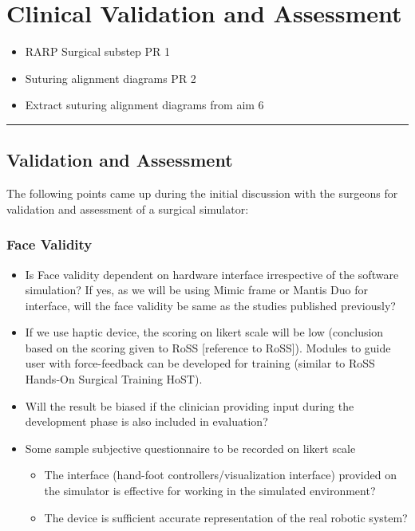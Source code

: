 
\section{Clinical Validation and Assessment}\label{sec:clinical_validation}

\begin{itemize}
  \item RARP Surgical substep PR 1 
  \item Suturing alignment diagrams PR 2 
  \item Extract suturing alignment diagrams from aim 6 
\end{itemize}

\hrule%

\subsection{Validation and Assessment}\label{ssec:validation_assessment}

The following points came up during the initial discussion with the surgeons for validation and assessment of a surgical simulator:

\subsubsection{Face Validity}\label{sssec:face_validity}
\begin{itemize}
  \item Is Face validity dependent on hardware interface irrespective of the software simulation? If yes, as we will be using Mimic frame or Mantis Duo for interface, will the face validity be same as the studies published previously?
  \item If we use haptic device, the scoring on likert scale will be low (conclusion based on the scoring given to RoSS [reference to RoSS]). Modules to guide user with force-feedback can be developed for training (similar to RoSS Hands-On Surgical Training HoST).
  \item Will the result be biased if the clinician providing input during the development phase is also included in evaluation?
  \item Some sample subjective questionnaire to be recorded on likert scale
  \begin{itemize}
    \item The interface (hand-foot controllers/visualization interface) provided on the simulator is effective for working in the simulated environment?
    \item The device is sufficient accurate representation of the real robotic system?
  \end{itemize}
\end{itemize}


